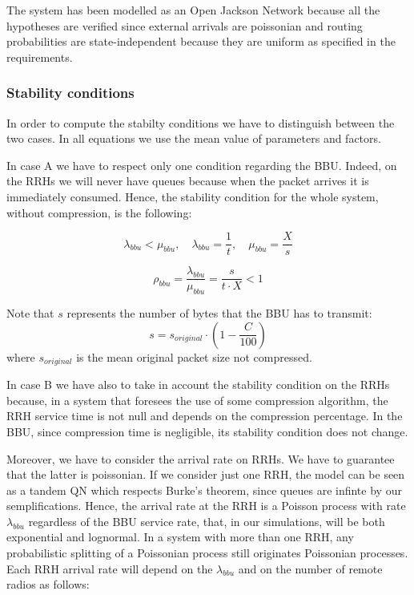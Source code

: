 \documentclass[11pt,a4paper,oneside, openright]{article}
\begin{document}
The system has been modelled as an Open Jackson Network because all the hypotheses are verified since external arrivals are poissonian and routing probabilities are state-independent because they are uniform as specified in the requirements.

\subsubsection{Stability conditions}
In order to compute the stabilty conditions we have to distinguish between the two cases. In all equations we use the mean value of parameters and factors.

In case A we have to respect only one condition regarding the BBU. Indeed, on the RRHs we will never have queues because when the packet arrives it is immediately consumed.
Hence, the stability condition for the whole system, without compression, is the following:

$$ \lambda_{bbu} < \mu_{bbu}, \quad \lambda_{bbu} = \frac{1}{t}, \quad \mu_{bbu} = \frac{X}{s}$$

\begin{equation} \label{eq:rho-bbu}
\rho_{bbu} = \frac{\lambda_{bbu}}{\mu_{bbu}} = \frac{s}{t \cdot X} < 1
\end{equation}

Note that $s$ represents the number of bytes that the BBU has to transmit:
$$s = s_{original}\cdot(1-\frac{C}{100})$$
where $ s_{original} $ is the mean original packet size not compressed.

In case B we have also to take in account the stability condition on the RRHs because, in a system that foresees the use of some compression algorithm, the RRH service time is not null and depends on the compression percentage. In the BBU, since compression time is negligible, its stability condition does not change. 

Moreover, we have to consider the arrival rate on RRHs.
We have to guarantee that the latter is poissonian. If we consider just one RRH, the model can be seen as a tandem QN which respects Burke's theorem, since queues are infinte by our semplifications. Hence, the arrival rate at the RRH is a Poisson process with rate $ \lambda_{bbu} $ regardless of the BBU service rate, that, in our simulations, will be both exponential and lognormal. 
In a system with more than one RRH, any probabilistic splitting of a Poissonian process still originates Poissonian processes. Each RRH arrival rate will depend on the $ \lambda_{bbu} $ and on the number of remote radios as follows:
\end{document}
